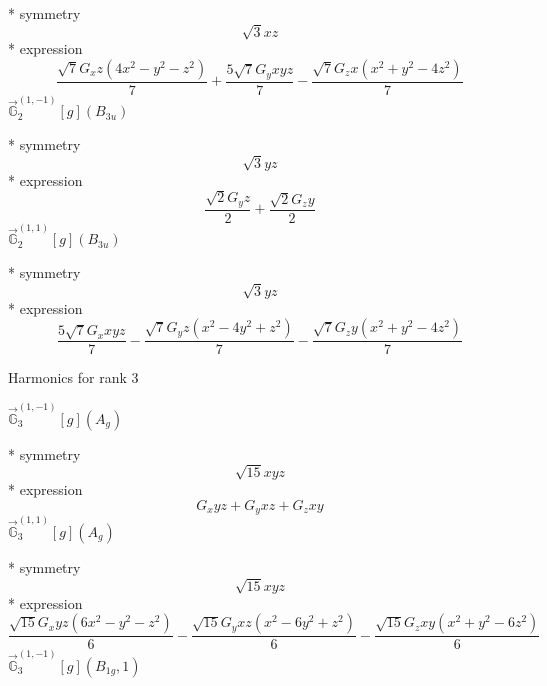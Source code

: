 \documentclass[fleqn,8pt]{jsarticle}
\begin{document}
\noindent\quad ** symmetry
\begin{dmath*}
\sqrt{3} x z
\end{dmath*}
\noindent\quad ** expression
\begin{dmath*}
\frac{\sqrt{7} G_{x} z \left(4 x^{2} - y^{2} - z^{2}\right)}{7} + \frac{5 \sqrt{7} G_{y} x y z}{7} - \frac{\sqrt{7} G_{z} x \left(x^{2} + y^{2} - 4 z^{2}\right)}{7}
\end{dmath*}
\noindent\quad $\vec{\mathbb{G}}_{2}^{(1,-1)}[g](B_{3u})$

\noindent\quad ** symmetry
\begin{dmath*}
\sqrt{3} y z
\end{dmath*}
\noindent\quad ** expression
\begin{dmath*}
\frac{\sqrt{2} G_{y} z}{2} + \frac{\sqrt{2} G_{z} y}{2}
\end{dmath*}
\noindent\quad $\vec{\mathbb{G}}_{2}^{(1,1)}[g](B_{3u})$

\noindent\quad ** symmetry
\begin{dmath*}
\sqrt{3} y z
\end{dmath*}
\noindent\quad ** expression
\begin{dmath*}
\frac{5 \sqrt{7} G_{x} x y z}{7} - \frac{\sqrt{7} G_{y} z \left(x^{2} - 4 y^{2} + z^{2}\right)}{7} - \frac{\sqrt{7} G_{z} y \left(x^{2} + y^{2} - 4 z^{2}\right)}{7}
\end{dmath*}

\noindent * Harmonics for rank 3

\noindent\quad $\vec{\mathbb{G}}_{3}^{(1,-1)}[g](A_{g})$

\noindent\quad ** symmetry
\begin{dmath*}
\sqrt{15} x y z
\end{dmath*}
\noindent\quad ** expression
\begin{dmath*}
G_{x} y z + G_{y} x z + G_{z} x y
\end{dmath*}
\noindent\quad $\vec{\mathbb{G}}_{3}^{(1,1)}[g](A_{g})$

\noindent\quad ** symmetry
\begin{dmath*}
\sqrt{15} x y z
\end{dmath*}
\noindent\quad ** expression
\begin{dmath*}
\frac{\sqrt{15} G_{x} y z \left(6 x^{2} - y^{2} - z^{2}\right)}{6} - \frac{\sqrt{15} G_{y} x z \left(x^{2} - 6 y^{2} + z^{2}\right)}{6} - \frac{\sqrt{15} G_{z} x y \left(x^{2} + y^{2} - 6 z^{2}\right)}{6}
\end{dmath*}
\noindent\quad $\vec{\mathbb{G}}_{3}^{(1,-1)}[g](B_{1g},1)$
\end{document}
